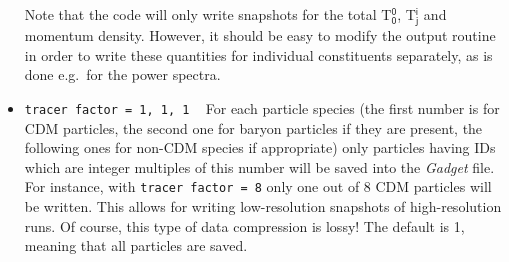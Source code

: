 \documentclass[a4paper,10pt]{article}
\begin{document}
\begin{itemize}
 Note that the code will only write snapshots for the total T$^\mathsf{0}_\mathsf{0}$, T$^\mathsf{i}_\mathsf{j}$ and momentum density. However, it should be easy to modify the output routine in order to write these quantities for individual constituents separately, as is done e.g.\ for the power spectra.
 \item[] \hspace{-25pt}\texttt{tracer factor = 1, 1, 1} ~ For each particle species (the first number is for CDM particles, the second one for baryon particles if they are present, the following ones for non-CDM species if appropriate) only particles having IDs which are integer multiples of this number will be saved into the \textit{Gadget} file. For instance, with \texttt{tracer factor = 8} only one out of 8 CDM particles will be written. This allows for writing low-resolution snapshots of high-resolution runs. Of course, this type of data compression is lossy! The default is 1, meaning that all particles are saved.
 

\end{itemize}
\end{document}
